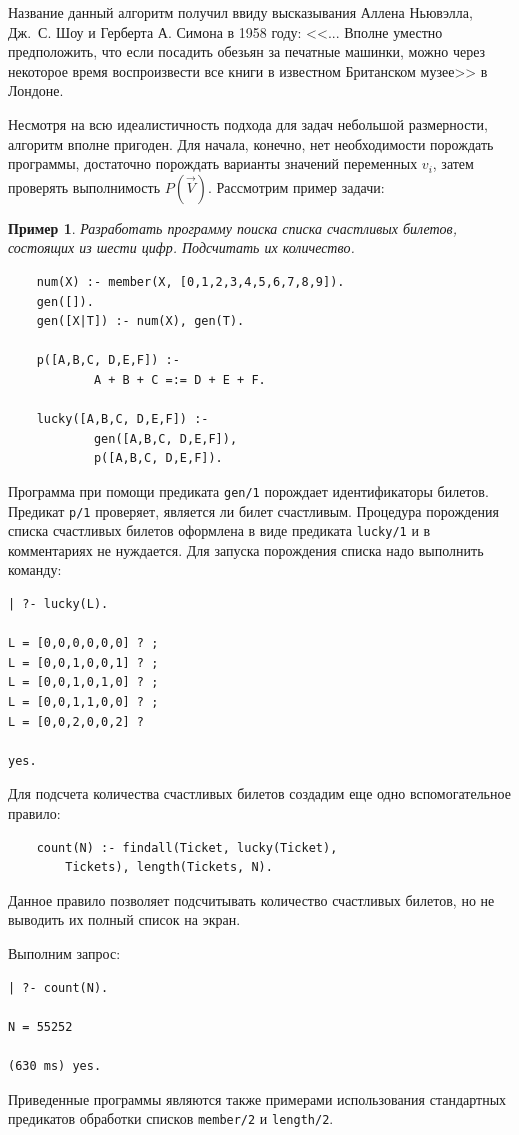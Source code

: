 \documentclass[12pt, openany, twoside]{book} %
\newtheorem{example}{Пример}[chapter]
\begin{document}
Название данный алгоритм получил ввиду высказывания Аллена Ньювэлла, Дж.~С. Шоу и Герберта А. Симона в 1958 году: <<... Вполне уместно предположить, что если посадить обезьян за печатные машинки, можно через некоторое время воспроизвести все книги в известном Британском музее>> в Лондоне.

Несмотря на всю идеалистичность подхода для задач небольшой размерности, алгоритм вполне пригоден. Для начала, конечно, нет необходимости порождать программы, достаточно порождать варианты значений переменных $v_i$, затем проверять выполнимость $P(\vec{V})$. Рассмотрим пример задачи:
\begin{example}
Разработать программу поиска списка счастливых билетов, состоящих из шести цифр. Подсчитать их количество.
\end{example}

{\tt\begin{verbatim}
    num(X) :- member(X, [0,1,2,3,4,5,6,7,8,9]).
    gen([]).
    gen([X|T]) :- num(X), gen(T).

    p([A,B,C, D,E,F]) :-
            A + B + C =:= D + E + F.

    lucky([A,B,C, D,E,F]) :-
            gen([A,B,C, D,E,F]),
            p([A,B,C, D,E,F]).
\end{verbatim}}

Программа при помощи предиката \texttt{gen/1} порождает идентификаторы билетов. Предикат \texttt{p/1} проверяет, является ли билет счастливым. Процедура порождения списка счастливых билетов оформлена в виде предиката \texttt{lucky/1} и в комментариях не нуждается. Для запуска порождения списка надо выполнить команду:
{\tt\begin{verbatim}
| ?- lucky(L).

L = [0,0,0,0,0,0] ? ;
L = [0,0,1,0,0,1] ? ;
L = [0,0,1,0,1,0] ? ;
L = [0,0,1,1,0,0] ? ;
L = [0,0,2,0,0,2] ?

yes.
\end{verbatim}}
Для подсчета количества счастливых билетов создадим еще одно вспомогательное правило:
{\tt\begin{verbatim}
    count(N) :- findall(Ticket, lucky(Ticket),
        Tickets), length(Tickets, N).
\end{verbatim}}
\noindent{}Данное правило позволяет подсчитывать количество счастливых билетов, но не выводить их полный список на экран.

Выполним запрос:
{\tt\begin{verbatim}
| ?- count(N).

N = 55252

(630 ms) yes.
\end{verbatim}}
\noindent{}Приведенные программы являются также примерами использования стандартных предикатов обработки списков \texttt{member/2} и \texttt{length/2}.
\end{document}
